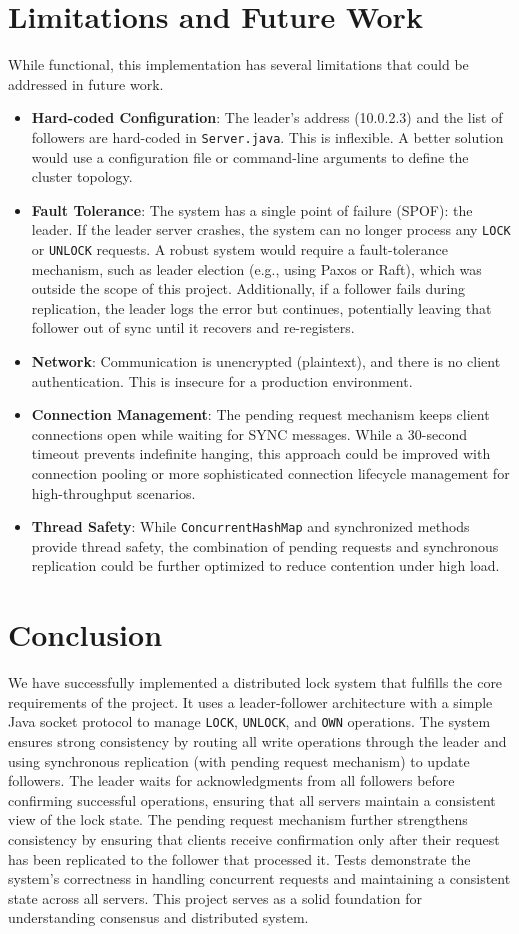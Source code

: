 \documentclass[a4paper,11pt]{article}
\begin{document}
\section{Limitations and Future Work}
While functional, this implementation has several limitations that could be addressed in future work.
\begin{itemize}
    \item \textbf{Hard-coded Configuration}: The leader's address (10.0.2.3) and the list of followers are hard-coded in \texttt{Server.java}. This is inflexible. A better solution would use a configuration file or command-line arguments to define the cluster topology.
    \item \textbf{Fault Tolerance}: The system has a single point of failure (SPOF): the leader. If the leader server crashes, the system can no longer process any \texttt{LOCK} or \texttt{UNLOCK} requests. A robust system would require a fault-tolerance mechanism, such as leader election (e.g., using Paxos or Raft), which was outside the scope of this project. Additionally, if a follower fails during replication, the leader logs the error but continues, potentially leaving that follower out of sync until it recovers and re-registers.
    \item \textbf{Network}: Communication is unencrypted (plaintext), and there is no client authentication. This is insecure for a production environment.
    \item \textbf{Connection Management}: The pending request mechanism keeps client connections open while waiting for SYNC messages. While a 30-second timeout prevents indefinite hanging, this approach could be improved with connection pooling or more sophisticated connection lifecycle management for high-throughput scenarios.
    \item \textbf{Thread Safety}: While \texttt{ConcurrentHashMap} and synchronized methods provide thread safety, the combination of pending requests and synchronous replication could be further optimized to reduce contention under high load.
\end{itemize}

\section{Conclusion}
We have successfully implemented a distributed lock system that fulfills the core requirements of the project. It uses a leader-follower architecture with a simple Java socket protocol to manage \texttt{LOCK}, \texttt{UNLOCK}, and \texttt{OWN} operations. The system ensures strong consistency by routing all write operations through the leader and using synchronous replication (with pending request mechanism) to update followers. The leader waits for acknowledgments from all followers before confirming successful operations, ensuring that all servers maintain a consistent view of the lock state. The pending request mechanism further strengthens consistency by ensuring that clients receive confirmation only after their request has been replicated to the follower that processed it. Tests demonstrate the system's correctness in handling concurrent requests and maintaining a consistent state across all servers. This project serves as a solid foundation for understanding consensus and distributed system.
\end{document}
